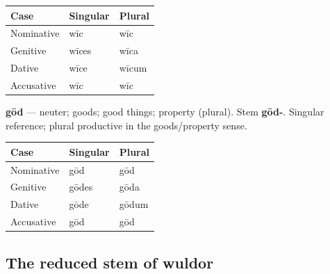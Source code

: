 \par\begingroup
\fontsize{10.5}{13.2}\selectfont
\setlength{\LTleft}{0pt}\setlength{\LTright}{\fill}
\noindent
\begin{tabular}{@{}>{\raggedright\arraybackslash}p{39.46mm}>{\raggedright\arraybackslash}p{39.46mm}>{\raggedright\arraybackslash}p{39.46mm}@{}}
\toprule
\textbf{Case} & \textbf{Singular} & \textbf{Plural} \\
\midrule
Nominative & wīc & wīc \\
Genitive & wīces & wīca \\
Dative & wīce & wīcum \\
Accusative & wīc & wīc \\
\bottomrule
\end{tabular}
\par\endgroup

\textbf{gōd} — neuter; goods; good things; property (plural). Stem \textbf{gōd-}. Singular reference; plural productive in the goods/\allowbreak{}property sense.

\par\begingroup
\fontsize{10.5}{13.2}\selectfont
\setlength{\LTleft}{0pt}\setlength{\LTright}{\fill}
\noindent
\begin{tabular}{@{}>{\raggedright\arraybackslash}p{39.46mm}>{\raggedright\arraybackslash}p{39.46mm}>{\raggedright\arraybackslash}p{39.46mm}@{}}
\toprule
\textbf{Case} & \textbf{Singular} & \textbf{Plural} \\
\midrule
Nominative & gōd & gōd \\
Genitive & gōdes & gōda \\
Dative & gōde & gōdum \\
Accusative & gōd & gōd \\
\bottomrule
\end{tabular}
\par\endgroup

\subsection*{The reduced stem of wuldor}

